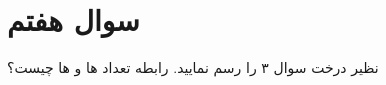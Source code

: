 \section{سوال هفتم}

 نظیر درخت سوال ۳ را رسم نمایید. رابطه تعداد ها و ها چیست؟


\begin{qsolve}
	
\end{qsolve}